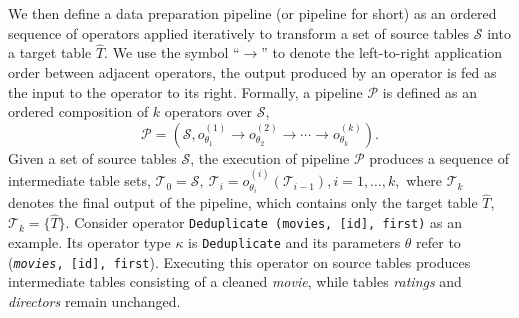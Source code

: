 We then define a data preparation pipeline (or pipeline for short) as an ordered sequence of operators applied iteratively to transform a set of source tables $\mathcal{S}$ into a target table $\hat{T}$. We use the symbol ``$\to$'' to denote the left-to-right application order between adjacent operators, \ie the output produced by an operator is fed as the input to the operator to its right. Formally, a pipeline $\mathcal{P}$ is defined as an ordered composition of $k$ operators over $\mathcal{S}$, \ie
%
\begin{equation} 
\label{eq:pipeline_definition}
    \mathcal{P} = (\mathcal{S}, o^{(1)}_{\theta_1} \to o^{(2)}_{\theta_2} \to \cdots \to o^{(k)}_{\theta_k}).
\end{equation}
%
Given a set of source tables $\mathcal{S}$, the execution of pipeline $\mathcal{P}$ produces a sequence of intermediate table sets, \ie 
%
$
    \mathcal{T}_{0} = \mathcal{S}, ~\mathcal{T}_i =  o^{(i)}_{\theta_i}(\mathcal{T}_{i-1}), i=1,\ldots,k, 
$
%
where $\mathcal{T}_k$ denotes the final output of the pipeline, which contains only the target table $\hat{T}$, \ie $\mathcal{T}_k=\{\hat{T}\}$.
%
Consider operator \texttt{Deduplicate (movies, [id], first)} as an example. 
Its operator type $\kappa$ is \texttt{Deduplicate} and its parameters $\theta$ refer to (\texttt{\textit{movies}, [id], first}). Executing this operator on source tables produces intermediate tables consisting of a cleaned \textit{movie}, while tables \textit{ratings} and \textit{directors} remain unchanged.

